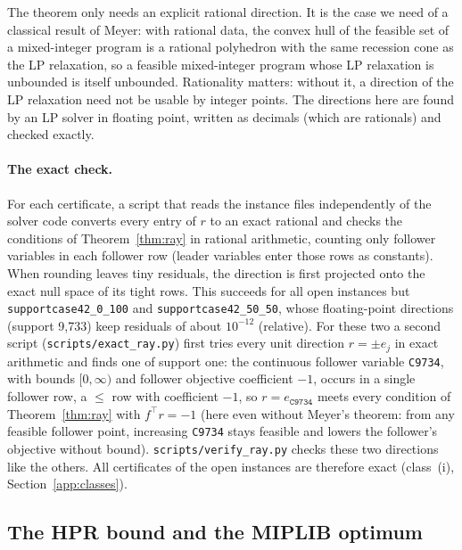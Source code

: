 \begin{remark}
The theorem only needs an explicit rational direction. It is the case we
need of a classical result of Meyer:\cite{meyer1974existence} with rational data, the convex hull of the feasible set
of a mixed-integer program is a rational polyhedron with the same recession
cone as the LP relaxation, so a feasible mixed-integer program whose LP
relaxation is unbounded is itself unbounded. Rationality matters: without it,
a direction of the LP relaxation need not be usable by integer points. The
directions here are found by an LP solver in floating point, written as
decimals (which are rationals) and checked exactly.
\end{remark}

\paragraph{The exact check.} For each certificate, a script that reads the
instance files independently of the solver code converts every entry of $r$
to an exact rational and checks the conditions of Theorem~\ref{thm:ray} in
rational arithmetic, counting only follower variables in each follower row
(leader variables enter those rows as constants). When rounding leaves tiny
residuals, the direction is first projected onto the exact null space of its
tight rows. This succeeds for all open instances but \texttt{supportcase42\_0\_100}
and \texttt{supportcase42\_50\_50}, whose floating-point directions (support
9{,}733) keep residuals of about $10^{-12}$ (relative). For these two a second
script (\texttt{scripts/exact\_ray.py}) first tries every unit direction
$r=\pm e_j$ in exact arithmetic and finds one of support one: the continuous
follower variable \texttt{C9734}, with bounds $[0,\infty)$ and follower
objective coefficient $-1$, occurs in a single follower row, a $\le$ row with
coefficient $-1$, so $r=e_{\texttt{C9734}}$ meets every condition of
Theorem~\ref{thm:ray} with $f^{\top}r=-1$ (here even without Meyer's theorem:
from any feasible follower point, increasing \texttt{C9734} stays feasible
and lowers the follower's objective without bound). \texttt{scripts/verify\_ray.py}
checks these two directions like the others. All \NumRayExact{} certificates
of the \NumNoFeasible{} open instances are therefore exact (class~(i),
Section~\ref{app:classes}).

\subsection{The HPR bound and the MIPLIB optimum}


